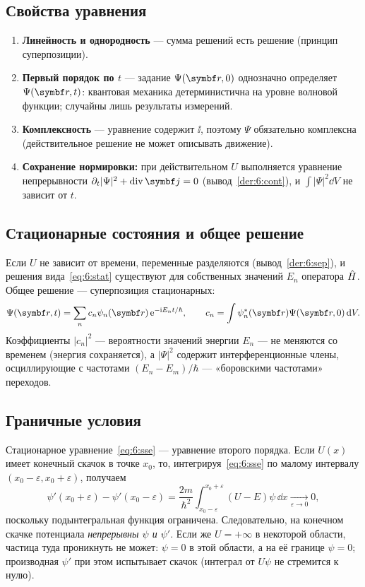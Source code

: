 \subsection{Свойства уравнения}

\begin{enumerate}
 \item \textbf{Линейность и однородность} — сумма решений есть решение (принцип суперпозиции).
 \item \textbf{Первый порядок по $t$} — задание $\Psi(\vect r,0)$ однозначно определяет $\Psi(\vect r,t)$:
       квантовая механика детерминистична на уровне волновой функции; случайны лишь результаты измерений.
 \item \textbf{Комплексность} — уравнение содержит $\ii$, поэтому $\Psi$ обязательно комплексна
       (действительное решение не может описывать движение).
 \item \textbf{Сохранение нормировки:} при действительном $U$ выполняется уравнение непрерывности
       $\partial_t|\Psi|^2+\operatorname{div}\vect j=0$ (вывод~\ref{der:6:cont}), и
       $\int|\Psi|^2\dd V$ не зависит от $t$.
\end{enumerate}

\subsection{Стационарные состояния и общее решение}

Если $U$ не зависит от времени, переменные разделяются (вывод~\ref{der:6:sep}), и решения
вида~\eqref{eq:6:stat} существуют для собственных значений $E_n$ оператора $\hat{H}$. Общее
решение — суперпозиция стационарных:
\begin{equation}\label{eq:6:gen}
  \Psi(\vect r,t)=\sum_nc_n\psi_n(\vect r)\,\ee^{-\ii E_nt/\hbar},\qquad
  c_n=\int\psi_n^*(\vect r)\Psi(\vect r,0)\,\dd V .
\end{equation}
Коэффициенты $|c_n|^2$ — вероятности значений энергии $E_n$ — не меняются со временем
(энергия сохраняется), а $|\Psi|^2$ содержит интерференционные члены, осциллирующие с
частотами $(E_n-E_m)/\hbar$ — «боровскими частотами» переходов.

\subsection{Граничные условия}

Стационарное уравнение~\eqref{eq:6:sse} — уравнение второго порядка. Если $U(x)$ имеет конечный
скачок в точке $x_0$, то, интегрируя~\eqref{eq:6:sse} по малому интервалу $(x_0-\varepsilon,x_0+\varepsilon)$, получаем
\[
  \psi'(x_0+\varepsilon)-\psi'(x_0-\varepsilon)=\frac{2m}{\hbar^2}\int_{x_0-\varepsilon}^{x_0+\varepsilon}(U-E)\psi\,\dd x\xrightarrow[\varepsilon\to0]{}0 ,
\]
поскольку подынтегральная функция ограничена. Следовательно, на конечном скачке потенциала
\emph{непрерывны $\psi$ и $\psi'$}. Если же $U=+\infty$ в некоторой области, частица туда
проникнуть не может: $\psi=0$ в этой области, а на её границе $\psi=0$; производная $\psi'$
при этом испытывает скачок (интеграл от $U\psi$ не стремится к нулю).

